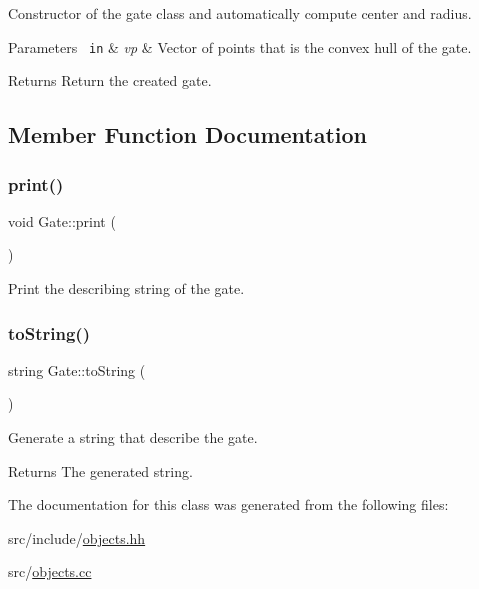 Constructor of the gate class and automatically compute center and radius. 


\begin{DoxyParams}[1]{Parameters}
\mbox{\texttt{ in}}  & {\em vp} & Vector of points that is the convex hull of the gate. \\
\hline
\end{DoxyParams}
\begin{DoxyReturn}{Returns}
Return the created gate. 
\end{DoxyReturn}


\subsection{Member Function Documentation}
\mbox{\label{class_gate_afdf8579acddb7b4f5be42e861c2c1db2}} 
\subsubsection{\texorpdfstring{print()}{print()}}
{\footnotesize\ttfamily void Gate\+::print (\begin{DoxyParamCaption}{ }\end{DoxyParamCaption})}



Print the describing string of the gate. 

\mbox{\label{class_gate_a56194536f033ef34b9dfd23581afff5d}} 
\subsubsection{\texorpdfstring{toString()}{toString()}}
{\footnotesize\ttfamily string Gate\+::to\+String (\begin{DoxyParamCaption}{ }\end{DoxyParamCaption})}



Generate a string that describe the gate. 

\begin{DoxyReturn}{Returns}
The generated string. 
\end{DoxyReturn}


The documentation for this class was generated from the following files\+:\begin{DoxyCompactItemize}
\item 
src/include/\mbox{\hyperlink{objects_8hh}{objects.\+hh}}\item 
src/\mbox{\hyperlink{objects_8cc}{objects.\+cc}}\end{DoxyCompactItemize}
